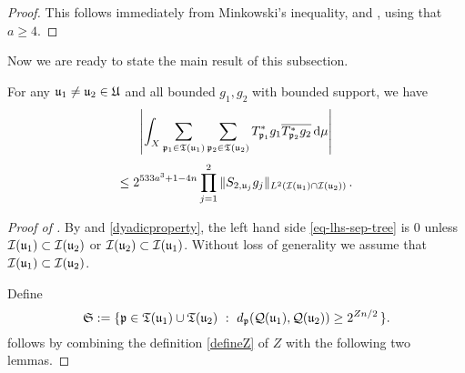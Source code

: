 \begin{proof}
    \leanok
    This follows immediately from Minkowski's inequality,  and , using that $a \ge 4$.
\end{proof}


Now we are ready to state the main result of this subsection.

\begin{lemma}
    \label{correlation-separated-trees}
    \leanok
    For any ${\mathfrak u}_1 \ne {\mathfrak u}_2 \in {\mathfrak U}$ and all bounded $g_1, g_2$ with bounded support, we have
    \begin{equation}
        \label{eq-lhs-sep-tree}
        \left| \int_X \sum_{{\mathfrak p}_1 \in {\mathfrak T}({\mathfrak u}_1)} \sum_{{\mathfrak p}_2 \in {\mathfrak T}({\mathfrak u}_2)} T^*_{{\mathfrak p}_1}g_1 \overline{T^*_{{\mathfrak p}_2}g_2 }\,\mathrm{d}\mu \right|
    \end{equation}
    \begin{equation}
        \label{eq-rhs-sep-tree}
        \le 2^{533a^3+1-4n} \prod_{j =1}^2 \| S_{2, {\mathfrak u}_j} g_j\|_{L^2({\mathcal{I}}({\mathfrak u}_1) \cap {\mathcal{I}}({\mathfrak u}_2))}\,.
    \end{equation}
\end{lemma}

\begin{proof}[Proof of ]
    \leanok
    By  and \eqref{dyadicproperty}, the left hand side \eqref{eq-lhs-sep-tree} is $0$ unless ${\mathcal{I}}({\mathfrak u}_1) \subset {\mathcal{I}}({\mathfrak u}_2)$ or ${\mathcal{I}}({\mathfrak u}_2) \subset {\mathcal{I}}({\mathfrak u}_1)$. Without loss of generality we assume that ${\mathcal{I}}({\mathfrak u}_1) \subset {\mathcal{I}}({\mathfrak u}_2)$.

    Define
    \begin{equation}
        \label{def-Tree-S-set}
         \mathfrak{S} := \{\fp \in \fT(\fu_1) \cup \fT(\fu_2) \ : \ d_{\fp}(\fcc(\fu_1), \fcc(\fu_2)) \ge 2^{Zn/2}\,\}.
    \end{equation}
     follows by combining the definition \eqref{defineZ} of $Z$ with the following two lemmas.
\end{proof}

